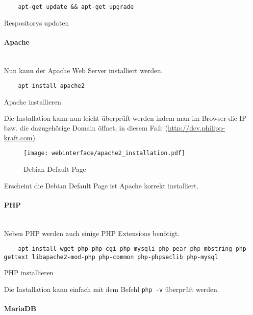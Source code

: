 \begin{listing}[H]
  \begin{verbatim}
    apt-get update && apt-get upgrade
  \end{verbatim}
  \caption{Respositorys updaten}
\end{listing}

\paragraph{Apache}\mbox{}\\

Nun kann der Apache Web Server installiert werden.

\begin{listing}[H]
  \begin{verbatim}
    apt install apache2
  \end{verbatim}
  \caption{Apache installieren}
\end{listing}

Die Installation kann nun leicht überprüft werden indem man im Browser die IP
bzw. die dazugehörige Domain öffnet, in diesem Fall:
(\url{http://dev.philipp-kraft.com}).

\begin{figure}[H]
  \centering
  \texttt{[image: webinterface/apache2\_installation.pdf]}
  \caption{Debian Default Page}
\end{figure}

Erscheint die Debian Default Page ist Apache korrekt installiert.

\paragraph{PHP}\mbox{}\\
Neben PHP werden auch einige PHP Extensions benötigt.

\begin{listing}[H]
  \begin{verbatim}
    apt install wget php php-cgi php-mysqli php-pear php-mbstring php-gettext libapache2-mod-php php-common php-phpseclib php-mysql
  \end{verbatim}
  \caption{PHP installieren}
\end{listing}

Die Installation kann einfach mit dem Befehl \verb|php -v| überprüft werden.

\paragraph{MariaDB}\mbox{}\\

